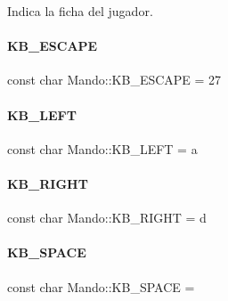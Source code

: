 Indica la ficha del jugador. 

\hypertarget{classMando_a3c4e7465d5b25fcaf8f3b50b444421a3}{}\label{classMando_a3c4e7465d5b25fcaf8f3b50b444421a3} 
\paragraph{\texorpdfstring{K\+B\+\_\+\+E\+S\+C\+A\+PE}{KB\_ESCAPE}}
{\footnotesize\ttfamily const char Mando\+::\+K\+B\+\_\+\+E\+S\+C\+A\+PE = 27\hspace{0.3cm}{\ttfamily [static]}}

\hypertarget{classMando_a61277e93015f5d44d37416f1475be542}{}\label{classMando_a61277e93015f5d44d37416f1475be542} 
\paragraph{\texorpdfstring{K\+B\+\_\+\+L\+E\+FT}{KB\_LEFT}}
{\footnotesize\ttfamily const char Mando\+::\+K\+B\+\_\+\+L\+E\+FT = \textquotesingle{}a\textquotesingle{}\hspace{0.3cm}{\ttfamily [static]}}

\hypertarget{classMando_a75b32aa31a64931f62c5737b8f09bf39}{}\label{classMando_a75b32aa31a64931f62c5737b8f09bf39} 
\paragraph{\texorpdfstring{K\+B\+\_\+\+R\+I\+G\+HT}{KB\_RIGHT}}
{\footnotesize\ttfamily const char Mando\+::\+K\+B\+\_\+\+R\+I\+G\+HT = \textquotesingle{}d\textquotesingle{}\hspace{0.3cm}{\ttfamily [static]}}

\hypertarget{classMando_ade68606cf2abf043c08e281d1531c78a}{}\label{classMando_ade68606cf2abf043c08e281d1531c78a} 
\paragraph{\texorpdfstring{K\+B\+\_\+\+S\+P\+A\+CE}{KB\_SPACE}}
{\footnotesize\ttfamily const char Mando\+::\+K\+B\+\_\+\+S\+P\+A\+CE = \textquotesingle{} \textquotesingle{}\hspace{0.3cm}{\ttfamily [static]}}

